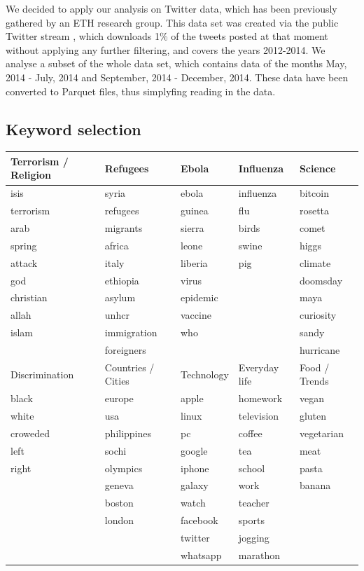 \documentclass[12pt, a4paper]{article}
\begin{document}
We decided to apply our analysis on Twitter data, which has been previously gathered by an ETH research group. This data set was created via the public Twitter stream \cite{twitterstream}, which downloads 1\% of the tweets posted at that moment without applying any further filtering, and covers the years 2012-2014. We analyse a subset of the whole data set, which contains data of the months May, 2014 - July, 2014 and September, 2014 - December, 2014. These data have been converted to Parquet files, thus simplyfing reading in the data.

\subsection{Keyword selection}
\begin{center}
  \begin{adjustbox}{max width=\textwidth}\label{tab:keywords}
    \begin{tabular}{ | l | l | l | l | l | }
    \hline
    Terrorism / Religion & Refugees & Ebola & Influenza & Science \\ \hline
    isis & syria & ebola & influenza & bitcoin \\
    terrorism & refugees & guinea & flu & rosetta \\
    arab & migrants & sierra & birds & comet \\
    spring & africa & leone & swine & higgs \\
    attack & italy & liberia & pig & climate \\
    god & ethiopia & virus &  & doomsday \\
    christian & asylum & epidemic &  & maya \\
    allah & unhcr & vaccine &  & curiosity \\
    islam & immigration & who &  & sandy \\
     & foreigners &  &  & hurricane \\ \hline \hline
     
    Discrimination & Countries / Cities & Technology & Everyday life & Food / Trends \\ \hline
    
    black & europe & apple & homework & vegan \\
    white & usa & linux & television & gluten \\
    croweded & philippines & pc & coffee & vegetarian \\
    left & sochi & google & tea & meat \\
    right & olympics & iphone & school & pasta \\
     & geneva & galaxy & work & banana \\
     & boston & watch & teacher & \\
     & london & facebook & sports & \\
     &  & twitter & jogging & \\
     &  & whatsapp &  marathon & \\ \hline \hline
     

\end{tabular}
\end{adjustbox}
\end{center}
\end{document}
